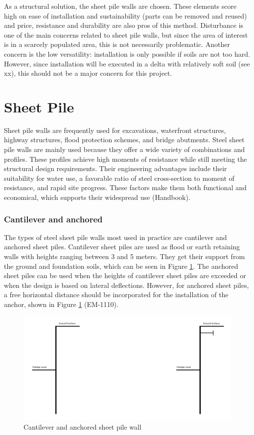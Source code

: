 As a structural solution, the sheet pile walls are chosen. These elements score high on ease of installation and sustainability (parts can be removed and reused) and price, resistance and durability are also pros of this method. Disturbance is one of the main concerns related to sheet pile walls, but since the area of interest is in a scarcely populated area, this is not necessarily problematic. Another concern is the low versatility: installation is only possible if soils are not too hard. However, since installation will be executed in a delta with relatively soft soil (see xx), this should not be a major concern for this project.

\section{Sheet Pile}
\label{section:sheet_pile_wall}

Sheet pile walls are frequently used for excavations, waterfront structures, highway structures, flood protection schemes, and bridge abutments. Steel sheet pile walls are mainly used because they offer a wide variety of combinations and profiles. These profiles achieve high moments of resistance while still meeting the structural design requirements. Their engineering advantages include their suitability for water use, a favorable ratio of steel cross-section to moment of resistance, and rapid site progress. These factors make them both functional and economical, which supports their widespread use (Handbook).

\subsubsection{Cantilever and anchored}

The types of steel sheet pile walls most used in practice are cantilever and anchored sheet piles. Cantilever sheet piles are used as flood or earth retaining walls with heights ranging between 3 and 5 meters. They get their support from the ground and foundation soils, which can be seen in Figure \ref{fig:sheetpiles}. The anchored sheet piles can be used when the heights of cantilever sheet piles are exceeded or when the design is based on lateral deflections. However, for anchored sheet piles, a free horizontal distance should be incorporated for the installation of the anchor, shown in Figure \ref{fig:sheetpiles} (EM-1110).

\begin{figure}[H]
    \centering
    \includegraphics[width=0.70\linewidth]{figures/ch8/cantilever_anchored.png}
    \caption{Cantilever and anchored sheet pile wall}
    \label{fig:sheetpiles}
\end{figure}

